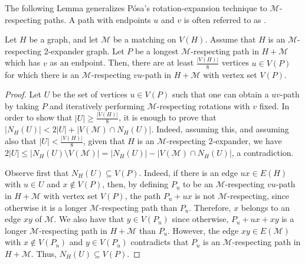 \documentclass[10pt,a4paper,reqno]{amsart}
\begin{document}
The following Lemma generalizes P\'{o}sa's rotation-expansion technique to $\mathcal{M}$-respecting paths. A path with endpoints $u$ and $v$ is often referred to as . 
\begin{lemma}
  \label{lem:posa-expander}
  Let $H$ be a graph, and let $\mathcal{M}$ be a matching on $V(H)$. Assume that $H$ is
  an $\mathcal{M}$-respecting $2$-expander graph. Let $P$ be a longest $\mathcal{M}$-respecting path in $H + \mathcal{M}$ which has $v$ as an endpoint. Then, there are at least $\frac{|V(H)|}{8}$ vertices $u \in V(P)$ for which there is an $\mathcal{M}$-respecting $vu$-path in $H + \mathcal{M}$ with vertex set $V(P)$.
\end{lemma}
\begin{proof}
Let $U$ be the set of vertices $u \in V(P)$ such that one can obtain a $uv$-path by taking $P$ and iteratively performing $\mathcal{M}$-respecting rotations with $v$ fixed. In order to show that $|U| \geq \frac{|V(H)|}{8}$, it is enough to prove that $|N_H(U)| < 2|U| + |V(\mathcal{M}) \cap N_H(U)|$. Indeed, assuming this, and assuming also that $|U| < \frac{|V(H)|}{8}$, given that $H$ is an $\mathcal{M}$-respecting $2$-expander, we have $2|U| \leq |N_H(U) \setminus V(\mathcal{M})| = |N_H(U)| - |V(\mathcal{M}) \cap N_H(U)|$, a contradiction.

Observe first that $N_H(U) \subseteq V(P)$. Indeed, if there is an edge $ux \in E(H)$ with $u \in U$ and $x \not\in V(P)$, then, by defining $P_u$ to be an $\mathcal{M}$-respecting $vu$-path in $H + \mathcal{M}$ with vertex set $V(P)$, the path $P_u + ux$ is not $\mathcal{M}$-respecting, since otherwise it is a longer $\mathcal{M}$-respecting path than $P_u$. Therefore, $x$ belongs to an edge $xy$ of $\mathcal{M}$. We also have that $y \in V(P_u)$ since otherwise, $P_u + ux + xy$ is a longer $\mathcal{M}$-respecting path in $H + \mathcal{M}$ than $P_u$. However, the edge $xy \in E(\mathcal{M})$ with $x \not\in V(P_u)$ and $y \in V(P_u)$ contradicts that $P_u$ is an $\mathcal{M}$-respecting path in $H + \mathcal{M}$. Thus, $N_H(U) \subseteq V(P)$.


\end{proof}
\end{document}
